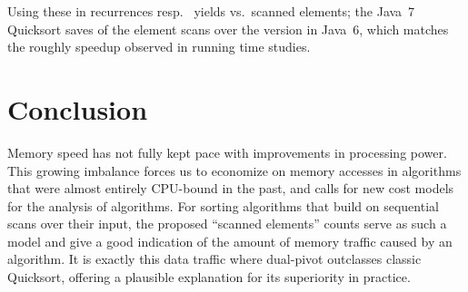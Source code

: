 \documentclass[]{theotage}
\begin{document}
Using these in recurrences  resp.\  
yields  vs.\  scanned elements;
the Java~7 Quicksort saves  of the element scans over the version in
Java~6, which matches the roughly  speedup observed in running time studies.


\section{Conclusion}

Memory speed has not fully kept pace with improvements in processing power. 
This growing imbalance forces us to economize on memory accesses 
in algorithms that were almost entirely CPU-bound in the past, 
and calls for new cost models for the analysis of algorithms.
For sorting algorithms that build on sequential scans over their input,
the proposed ``scanned elements'' counts serve as such a model and 
give a good indication of the amount of memory traffic caused by an algorithm.
It is exactly this data traffic where dual-pivot outclasses classic Quicksort,
offering a plausible explanation for its superiority in practice.




\end{document}
